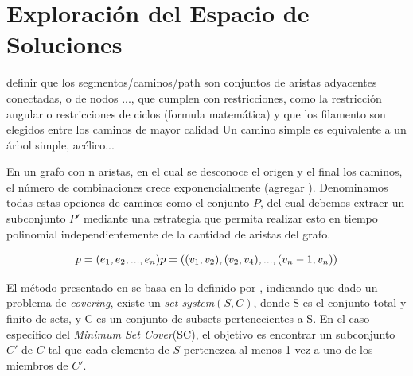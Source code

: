 

\section{Exploraci\'on del Espacio de Soluciones}
definir que los segmentos/caminos/path son conjuntos de aristas adyacentes conectadas, o de nodos ..., que cumplen con restricciones, como la restricción angular o restricciones de ciclos (formula matem\'atica) y que los filamento son elegidos entre los caminos de mayor calidad
Un camino simple es equivalente a un \'arbol simple, ac\'clico...


En un grafo con n aristas, en el cual se desconoce el origen y el final los caminos, el n\'umero de combinaciones crece exponencialmente (agregar \cite{buchin2007number}\cite{biswas2012hamiltonian}). Denominamos todas estas opciones de caminos como el conjunto $P$, del cual debemos extraer un subconjunto $P'$ mediante una estrategia que permita realizar esto en tiempo polinomial independientemente de la cantidad de aristas del grafo.

\begin{equation}
p = (e_1, e_2,..., e_n)\\
p = ((v_1,v_2), (v_2,v_4),..., (v_n-1,v_n))
\label{eq:path}
\end{equation}

El m\'etodo presentado en \cite{breuer2015define} se basa en lo definido por \cite{lin2006vertex}, indicando que dado un problema de {\it covering}, existe un {\it set system}$(S,C)$, donde S es el conjunto total y finito de sets, y C es un conjunto de subsets pertenecientes a S. En el caso espec\'ifico del {\it Minimum Set Cover}(SC), el objetivo es encontrar un subconjunto $C'$ de $C$ tal que cada elemento de $S$ pertenezca al menos 1 vez a uno de los miembros de $C'$.

